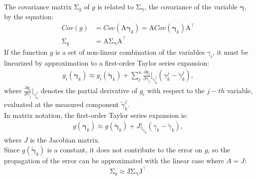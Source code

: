 The covariance matrix $\mathrm {\Sigma }_g$ of $g$ is related to $\mathrm {\Sigma }_{\boldsymbol{\gamma}}$, the covariance of the variable $\boldsymbol{\gamma}$, by the equation:
\begin{subequations}
\begin{align}
Cov(g) &= Cov(\mathrm {A}\boldsymbol{\gamma}_k) = \mathrm {A}Cov(\boldsymbol{\gamma}_k)\mathrm {A} ^{\top} \\[5pt]
\mathrm {\Sigma }_g &=\mathrm {A} \mathrm {\Sigma }_{\boldsymbol{\gamma}}\mathrm {A} ^{\top}
\end{align}
\end{subequations}
If the function $g$ is a set of non-linear combination of the variables $\gamma_i$,  it must be linearized by approximation to a first-order Taylor series expansion:
\begin{align}
g_{i}(\boldsymbol{\gamma}_{k}) \approx g_{i}(\tilde{\boldsymbol{\gamma}}_{k})+\sum _{j}^{n}{\frac  {\partial g_{i}}{\partial {\gamma_{j}}}}\Big|_{\tilde{\gamma}_k^{j}}(\gamma_k^{j}-\tilde{\gamma}_k^{j}),
\end{align}
where ${\frac  {\partial g_{i}}{\partial {\gamma_{j}}}}\Big|_{\tilde{\gamma}_k^{j}}$ denotes the partial derivative of $g_i$ with respect to the $j-th$ variable, evaluated at the measured component $\tilde{\gamma}_k^{j}$.\\
In matrix notation, the first-order Taylor series expansion is:
\begin{align}
g(\boldsymbol{\gamma}_{k}) \approx g(\tilde{\boldsymbol{\gamma}}_{k})+J\Big|_{\tilde{\gamma}_k}(\gamma_k-\tilde{\gamma}_k),
\end{align}
where $J$ is the Jacobian matrix.\\
Since $g(\tilde{\boldsymbol{\gamma}}_{k})$ is a constant, it does not contribute to the error on $g$, so the propagation of the error can be approximated with the linear case where $A = J$:
\begin{align}
{\displaystyle \mathrm {\Sigma }_g\approx \mathrm {J} \mathrm {\Sigma }_{\boldsymbol{\gamma}}\mathrm {J} ^{\top}} 
\label{eq:errorpropag}
\end{align}

